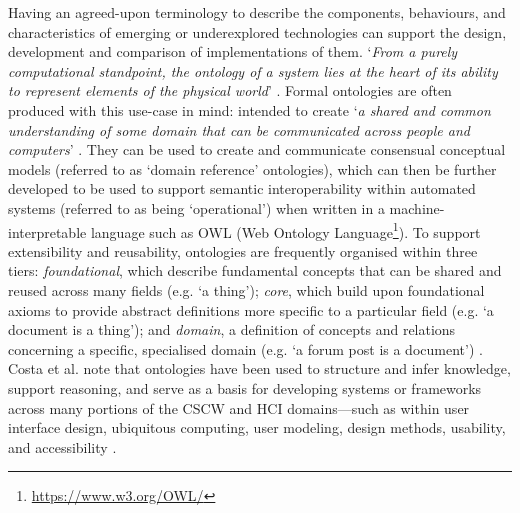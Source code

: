Having an agreed-upon terminology to describe the components, behaviours, and characteristics of emerging or underexplored technologies can support the design, development and comparison of implementations of them. `\textit{From a purely computational standpoint, the ontology of a system lies at the heart of its ability to represent elements of the physical world}' \cite{Brubaker2011}. Formal ontologies are often produced with this use-case in mind: intended to create `\textit{a shared and common understanding of some domain that can be communicated across people and computers}' \cite{struder1998}. They can be used to create and communicate consensual conceptual models (referred to as `domain reference' ontologies), which can then be further developed to be used to support semantic interoperability within automated systems (referred to as being `operational') \cite{guizzardi2007} when written in a machine-interpretable language such as OWL (Web Ontology Language\footnote{\url{https://www.w3.org/OWL/}}). To support extensibility and reusability, ontologies are frequently organised within three tiers: \textit{foundational}, which describe fundamental concepts that can be shared and reused across many fields (e.g. `a thing'); \textit{core}, which build upon foundational axioms to provide abstract definitions more specific to a particular field (e.g. `a document is a thing'); and \textit{domain}, a definition of concepts and relations concerning a specific, specialised domain (e.g. `a forum post is a document') \cite{scherp2011}. Costa et al. note that ontologies have been used to structure and infer knowledge, support reasoning, and serve as a basis for developing systems or frameworks across many portions of the CSCW and HCI domains---such as within user interface design, ubiquitous computing, user modeling, design methods, usability, and accessibility \cite{costa2021}. 

